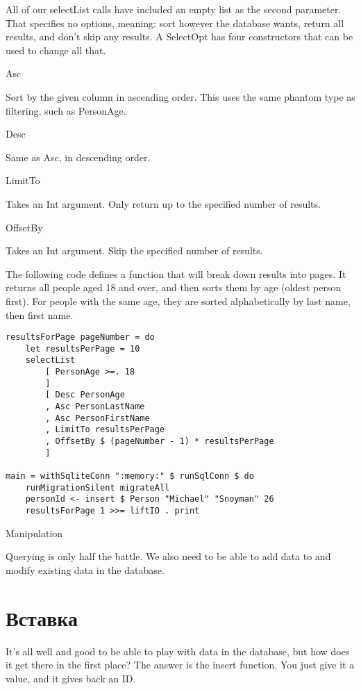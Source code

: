All of our selectList calls have included an empty list as the second parameter. That specifies no options, meaning: sort however the database wants, return all results, and don't skip any results. A SelectOpt has four constructors that can be used to change all that.

Asc

Sort by the given column in ascending order. This uses the same phantom type as filtering, such as PersonAge.

Desc

Same as Asc, in descending order.

LimitTo

Takes an Int argument. Only return up to the specified number of results.

OffsetBy

Takes an Int argument. Skip the specified number of results.

The following code defines a function that will break down results into pages. It returns all people aged 18 and over, and then sorts them by age (oldest person first). For people with the same age, they are sorted alphabetically by last name, then first name.

\begin{lstlisting}
resultsForPage pageNumber = do
    let resultsPerPage = 10
    selectList
        [ PersonAge >=. 18
        ]
        [ Desc PersonAge
        , Asc PersonLastName
        , Asc PersonFirstName
        , LimitTo resultsPerPage
        , OffsetBy $ (pageNumber - 1) * resultsPerPage
        ]

main = withSqliteConn ":memory:" $ runSqlConn $ do
    runMigrationSilent migrateAll
    personId <- insert $ Person "Michael" "Snoyman" 26
    resultsForPage 1 >>= liftIO . print
\end{lstlisting}%

Manipulation %

Querying is only half the battle. We also need to be able to add data to and modify existing data in the database.

\section{Вставка} %

It's all well and good to be able to play with data in the database, but how does it get there in the first place? The answer is the insert function. You just give it a value, and it gives back an ID.

